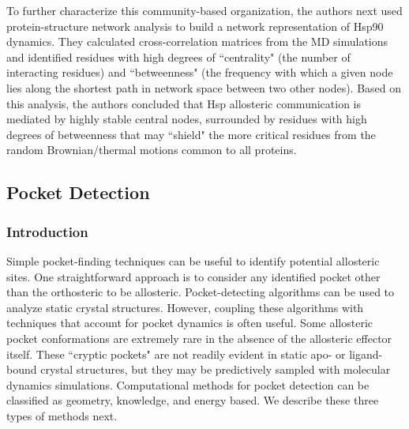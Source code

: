 \par To further characterize this community-based organization, the authors next used protein-structure network analysis to build a network representation of Hsp90 dynamics. They calculated cross-correlation matrices from the MD simulations and identified residues with high degrees of ``centrality" (the number of interacting residues) and ``betweenness" (the frequency with which a given node lies along the shortest path in network space between two other nodes). Based on this analysis, the authors concluded that Hsp allosteric communication is mediated by highly stable central nodes, surrounded by residues with high degrees of betweenness that may ``shield" the more critical residues from the random Brownian/thermal motions common to all proteins.
\subsection{Pocket Detection}
\subsubsection{Introduction}
\par Simple pocket-finding techniques can be useful to identify potential allosteric sites. One straightforward approach is to consider any identified pocket other than the orthosteric to be allosteric. Pocket-detecting algorithms can be used to analyze static crystal structures. However, coupling these algorithms with techniques that account for pocket dynamics is often useful. Some allosteric pocket conformations are extremely rare in the absence of the allosteric effector itself. These ``cryptic pockets" are not readily evident in static apo- or ligand-bound crystal structures, but they may be predictively sampled with molecular dynamics simulations.\cite{Frembgen-Kesner2006,Bowman2012a,Wassman2013,Nair2014,Bowman2015b} Computational methods for pocket detection can be classified as geometry, knowledge, and energy based. We describe these three types of methods next.
